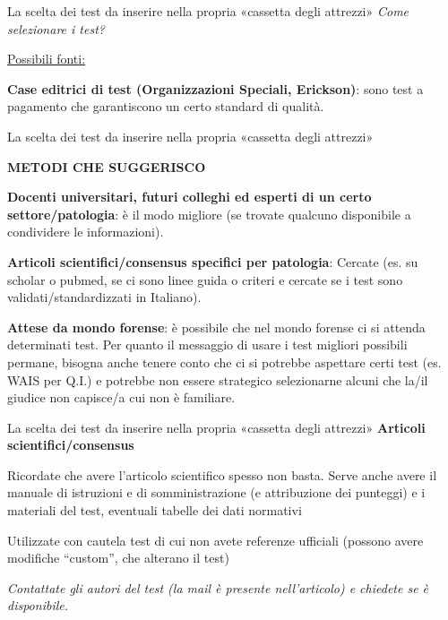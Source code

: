 \documentclass[
  ignorenonframetext,
  aspectratio=169,
]{beamer}
\begin{document}
\begin{frame}{\small La scelta dei test da inserire nella propria
«cassetta degli attrezzi»}
\label{la-scelta-dei-test-da-inserire-nella-propria-cassetta-degli-attrezzi-2}
\emph{Come selezionare i test?}

\underline{Possibili fonti:}

\textbf{Case editrici di test (Organizzazioni Speciali, Erickson)}: sono
test a pagamento che garantiscono un certo standard di qualità.
\end{frame}

\begin{frame}{\small La scelta dei test da inserire nella propria
«cassetta degli attrezzi»}
\label{la-scelta-dei-test-da-inserire-nella-propria-cassetta-degli-attrezzi-3}
\begin{center}
  \textbf{METODI CHE SUGGERISCO}
\end{center}

\textbf{Docenti universitari, futuri colleghi ed esperti di un certo
settore/patologia}: è il modo migliore (se trovate qualcuno disponibile
a condividere le informazioni).

\textbf{Articoli scientifici/consensus specifici per patologia}: Cercate
(es. su scholar o pubmed, se ci sono linee guida o criteri e cercate se
i test sono validati/standardizzati in Italiano).

\textbf{Attese da mondo forense}: è possibile che nel mondo forense ci
si attenda determinati test. Per quanto il messaggio di usare i test
migliori possibili permane, bisogna anche tenere conto che ci si
potrebbe aspettare certi test (es. WAIS per Q.I.) e potrebbe non essere
strategico selezionarne alcuni che la/il giudice non capisce/a cui non è
familiare.
\end{frame}

\begin{frame}{\small La scelta dei test da inserire nella propria
«cassetta degli attrezzi»}
\label{la-scelta-dei-test-da-inserire-nella-propria-cassetta-degli-attrezzi-4}
\textbf{Articoli scientifici/consensus}

Ricordate che avere l'articolo scientifico spesso non basta. Serve anche
avere il manuale di istruzioni e di somministrazione (e attribuzione dei
punteggi) e i materiali del test, eventuali tabelle dei dati normativi

Utilizzate con cautela test di cui non avete referenze ufficiali
(possono avere modifiche ``custom'', che alterano il test)

\emph{Contattate gli autori del test (la mail è presente nell'articolo)
e chiedete se è disponibile.}
\end{frame}
\end{document}
